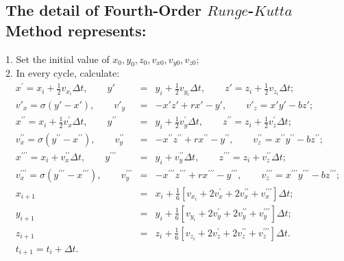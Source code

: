 \documentclass{article}
\begin{document}
\subsection{\noindent The detail of Fourth-Order $Runge$-$Kutta$ Method represents:}
1. Set the initial value of $x_0,y_0,z_0,v_{x0},v_{y0},v_{z0}$;\\
2. In every cycle, calculate:
\begin{eqnarray*}
x^{\prime} = x_{i} + \frac{1}{2}v_{x_{i}}\Delta t, \qquad y' &=& y_{i} + \frac{1}{2}v_{y_{i}}\Delta t, \qquad z' = z_{i} + \frac{1}{2}v_{z_{i}}\Delta t;\\
v'_x = \sigma (y'-x'), \qquad v'_y &=& -x'z'+rx'-y', \qquad v'_z = x'y'-bz';\\
x^{\prime\prime} = x_{i} + \frac{1}{2}v^{\prime}_{x}\Delta t, \qquad y^{\prime\prime} &=& y_{i} + \frac{1}{2}v^{\prime}_{y}\Delta t, \qquad z^{\prime\prime} = z_{i} + \frac{1}{2}v^{\prime}_{z}\Delta t;\\
v^{\prime\prime}_x = \sigma (y^{\prime\prime}-x^{\prime\prime}), \qquad v^{\prime\prime}_y &=& -x^{\prime\prime}z^{\prime\prime}+rx^{\prime\prime}-y^{\prime\prime}, \qquad v^{\prime\prime}_z = x^{\prime\prime}y^{\prime\prime}-bz^{\prime\prime};\\
x^{\prime\prime\prime} = x_{i} + v^{\prime\prime}_{x}\Delta t, \qquad y^{\prime\prime\prime} &=& y_{i} + v^{\prime\prime}_{y}\Delta t, \qquad z^{\prime\prime\prime} = z_{i} + v^{\prime\prime}_{z}\Delta t;\\
v^{\prime\prime\prime}_x = \sigma (y^{\prime\prime\prime}-x^{\prime\prime\prime}), \qquad v^{\prime\prime\prime}_y &=& -x^{\prime\prime\prime}z^{\prime\prime\prime}+rx^{\prime\prime\prime}-y^{\prime\prime\prime}, \qquad v^{\prime\prime\prime}_z = x^{\prime\prime\prime}y^{\prime\prime\prime}-bz^{\prime\prime\prime};\\
x_{i+1} &=& x_{i}+ \frac{1}{6}\left[v_{x_i}+2v^{\prime}_x+2v^{\prime\prime}_x+v^{\prime\prime\prime}_x\right]\Delta t;\\
y_{i+1} &=& y_{i}+ \frac{1}{6}\left[v_{y_i}+2v^{\prime}_y+2v^{\prime\prime}_y+v^{\prime\prime\prime}_y\right]\Delta t;\\
z_{i+1} &=& z_{i}+ \frac{1}{6}\left[v_{z_i}+2v^{\prime}_z+2v^{\prime\prime}_z+v^{\prime\prime\prime}_z\right]\Delta t.\\
t_{i+1} = t_{i}+\Delta t.\\
\end{eqnarray*}
\end{document}
